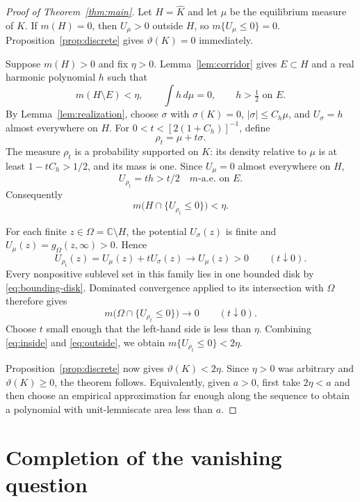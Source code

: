 \documentclass[11pt]{article}
\newcommand{\C}{\mathbb C}
\newcommand{\areaAE}{\text{a.e.}}
\theoremstyle{remark}
\numberwithin{equation}{section}
\begin{document}
\begin{proof}[Proof of Theorem~\ref{thm:main}]
Let $H=\widehat K$ and let $\mu$ be the equilibrium measure of $K$.
If $m(H)=0$, then $U_\mu>0$ outside $H$, so
$m\{U_\mu\le0\}=0$. Proposition~\ref{prop:discrete} gives
$\vartheta(K)=0$ immediately.

Suppose $m(H)>0$ and fix $\eta>0$.
Lemma~\ref{lem:corridor} gives $E\subset H$ and a real harmonic
polynomial $h$ such that
\[
 m(H\setminus E)<\eta,\qquad
 \int h\,d\mu=0,\qquad h>\tfrac12\text{ on }E.
\]
By Lemma~\ref{lem:realization}, choose $\sigma$ with
$\sigma(K)=0$, $|\sigma|\le C_h\mu$, and $U_\sigma=h$
almost everywhere on $H$. For
$0<t<[2(1+C_h)]^{-1}$, define
\begin{equation}\label{eq:perturb}
 \rho_t=\mu+t\sigma.
\end{equation}
The measure $\rho_t$ is a probability supported on $K$: its density
relative to $\mu$ is at least $1-tC_h>1/2$, and its mass is one.
Since $U_\mu=0$ almost everywhere on $H$,
\[
 U_{\rho_t}=t h>t/2\quad m\text{-}\areaAE\text{ on }E.
\]
Consequently
\begin{equation}\label{eq:inside}
 m\bigl(H\cap\{U_{\rho_t}\le0\}\bigr)<\eta.
\end{equation}

For each finite $z\in\Omega=\C\setminus H$, the potential
$U_\sigma(z)$ is finite and
$U_\mu(z)=g_\Omega(z,\infty)>0$. Hence
\[
 U_{\rho_t}(z)=U_\mu(z)+tU_\sigma(z)
 \longrightarrow U_\mu(z)>0\qquad(t\downarrow0).
\]
Every nonpositive sublevel set in this family lies in one bounded disk
by \eqref{eq:bounding-disk}. Dominated convergence applied to its
intersection with $\Omega$ therefore gives
\begin{equation}\label{eq:outside}
 m\bigl(\Omega\cap\{U_{\rho_t}\le0\}\bigr)
 \longrightarrow0\qquad(t\downarrow0).
\end{equation}
Choose $t$ small enough that the left-hand side is less than $\eta$.
Combining \eqref{eq:inside} and \eqref{eq:outside}, we obtain
$m\{U_{\rho_t}\le0\}<2\eta$.

Proposition~\ref{prop:discrete} now gives $\vartheta(K)<2\eta$.
Since $\eta>0$ was arbitrary and $\vartheta(K)\ge0$, the theorem
follows. Equivalently, given $a>0$, first take $2\eta<a$ and then
choose an empirical approximation far enough along the sequence to
obtain a polynomial with unit-lemniscate area less than $a$.
\end{proof}

\section{Completion of the vanishing question}
\label{sec:other}
\end{document}
